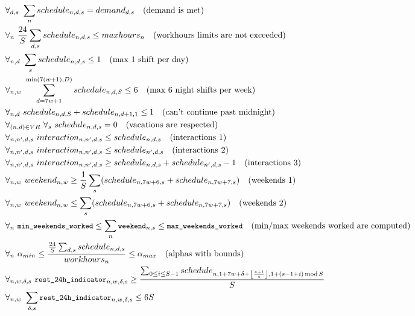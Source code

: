 \documentclass{article}
\newcommand{\varWeekendWorkedIndicator}[2]{\texttt{\small weekend}_{#1, #2}}
\newcommand{\varMinWeekendsWorked}{\texttt{\small min\_weekends\_worked}}
\newcommand{\varMaxWeekendsWorked}{\texttt{\small max\_weekends\_worked}}
\newcommand{\varDayLengthBreakIndicator}[4]{\texttt{\small rest\_24h\_indicator}_{#1, #2, #3, #4}}
\begin{document}
\begin{align*}
&\forall_{d,s}\ \sum_n schedule_{n,d,s} = demand_{d, s}\quad \text{(demand is met)} \\
&\forall_{n}\ \frac{24}S \sum_{d, s} schedule_{n,d,s} \leq maxhours_n \quad \text{(workhours limits are not exceeded)} \\
&\forall_{n,d}\ \sum_s schedule_{n,d,s} \leq 1\quad \text{(max 1 shift per day)} \\
&\forall_{n,w}\ \sum_{d=7w+1}^{\min(7(w+1), D)} schedule_{n,d,S} \leq 6\quad \text{(max 6 night shifts per week)} \\
&\forall_{n,d}\ schedule_{n,d,S}+schedule_{n,d+1,1} \leq 1\quad \text{(can't continue past midnight)} \\
&\forall_{(n,d)\in VR}\ \forall_s\ schedule_{n,d,s} = 0\quad \text{(vacations are respected)} \\
&\forall_{n,n',d,s}\ interaction_{n,n',d,s} \leq schedule_{n,d,s}\quad \text{(interactions 1)} \\
&\forall_{n,n',d,s}\ interaction_{n,n',d,s} \leq schedule_{n',d,s}\quad \text{(interactions 2)} \\
&\forall_{n,n',d,s}\ interaction_{n,n',d,s} \geq schedule_{n,d,s}+schedule_{n',d,s}-1\quad \text{(interactions 3)} \\
&\forall_{n, w}\ weekend_{n, w} \geq \frac{1}{S}\sum_s (schedule_{n, 7w+6, s} + schedule_{n, 7w+7, s}) \quad \text{(weekends 1)} \\
&\forall_{n, w}\ weekend_{n, w} \leq \sum_s (schedule_{n, 7w+6, s} + schedule_{n, 7w+7, s}) \quad \text{(weekends 2)} \\
&\forall_{n}\ \varMinWeekendsWorked \le \sum_n \varWeekendWorkedIndicator{n}{s} \le \varMaxWeekendsWorked \quad \text{(min/max weekends worked are computed)} \\
&\forall_{n}\ \alpha_{min} \leq \frac{\frac{24}{S}\sum_{d,s}schedule_{n,d,s}}{workhours_n} \leq \alpha_{max}\quad \text{(alphas with bounds)} \\
&\forall_{n,w,\delta,s}\ \varDayLengthBreakIndicator{n}{w}{\delta}{s} \ge \frac{\sum_{0 \le i \le S - 1} schedule_{n, 1+7w+\delta+\left\lfloor\frac{s+i}{s}\right\rfloor, 1 + (s - 1 + i) \operatorname{mod} S}}{S} \\
&\forall_{n, w}\ \sum_{\delta, s} \varDayLengthBreakIndicator{n}{w}{\delta}{s} \le 6S
\end{align*}
\end{document}
